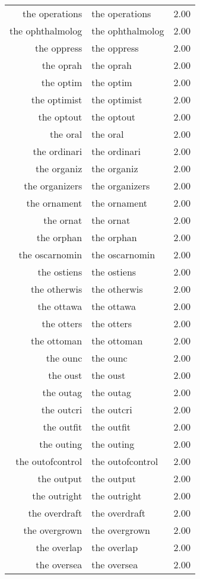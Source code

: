 \begin{table}[ht]
\begin{tabular}{rlr}
  the operations & the operations & 2.00 \\ 
  the ophthalmolog & the ophthalmolog & 2.00 \\ 
  the oppress & the oppress & 2.00 \\ 
  the oprah & the oprah & 2.00 \\ 
  the optim & the optim & 2.00 \\ 
  the optimist & the optimist & 2.00 \\ 
  the optout & the optout & 2.00 \\ 
  the oral & the oral & 2.00 \\ 
  the ordinari & the ordinari & 2.00 \\ 
  the organiz & the organiz & 2.00 \\ 
  the organizers & the organizers & 2.00 \\ 
  the ornament & the ornament & 2.00 \\ 
  the ornat & the ornat & 2.00 \\ 
  the orphan & the orphan & 2.00 \\ 
  the oscarnomin & the oscarnomin & 2.00 \\ 
  the ostiens & the ostiens & 2.00 \\ 
  the otherwis & the otherwis & 2.00 \\ 
  the ottawa & the ottawa & 2.00 \\ 
  the otters & the otters & 2.00 \\ 
  the ottoman & the ottoman & 2.00 \\ 
  the ounc & the ounc & 2.00 \\ 
  the oust & the oust & 2.00 \\ 
  the outag & the outag & 2.00 \\ 
  the outcri & the outcri & 2.00 \\ 
  the outfit & the outfit & 2.00 \\ 
  the outing & the outing & 2.00 \\ 
  the outofcontrol & the outofcontrol & 2.00 \\ 
  the output & the output & 2.00 \\ 
  the outright & the outright & 2.00 \\ 
  the overdraft & the overdraft & 2.00 \\ 
  the overgrown & the overgrown & 2.00 \\ 
  the overlap & the overlap & 2.00 \\ 
  the oversea & the oversea & 2.00 \\ 

\end{tabular}
\end{table}
